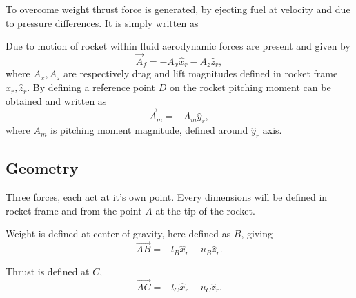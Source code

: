 To overcome weight thrust force is generated, by ejecting fuel at velocity and due to pressure differences. It is simply written as

Due to motion of rocket within fluid aerodynamic forces are present and given by
\begin{equation}
    \vec{A}_f = -A_x\hat{x}_r - A_z\hat{z}_r,
\end{equation}
where $A_x, A_z$ are respectively drag and lift magnitudes defined in rocket frame $\hat{x}_r, \hat{z}_r$. By defining a reference point $D$ on the rocket pitching moment can be obtained and written as
\begin{equation}
    \vec{A}_m = -A_m\hat{y}_r,
\end{equation}
where $A_m$ is pitching moment magnitude, defined around $\hat{y}_r$ axis.

\subsection{Geometry}\label{sec:geometry}
Three forces, each act at it's own point. Every dimensions will be defined in rocket frame and from the point $A$ at the tip of the rocket.

Weight is defined at center of gravity, here defined as $B$, giving
\begin{equation}
    \vec{AB} = -l_B\hat{x}_r - u_B\hat{z}_r.
\end{equation}

Thrust is defined at $C$,
\begin{equation}
    \vec{AC} = -l_C\hat{x}_r - u_C\hat{z}_r.
\end{equation}

